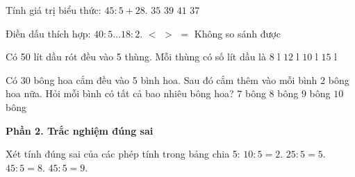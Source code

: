 \begin{ex} %
Tính giá trị biểu thức: $45 : 5 + 28$.
\choice
{$35$}
{$39$}
{$41$}
{\True $37$}
\end{ex}

\begin{ex} %
Điền dấu thích hợp: $40 : 5 \dots 18 : 2$.
\choice
{\True $<$}
{$>$}
{$=$}
{Không so sánh được}
\end{ex}

\begin{ex} %
Có 50 lít dầu rót đều vào 5 thùng. Mỗi thùng có số lít dầu là
\choice
{$8\text{ l}$}
{$12\text{ l}$}
{\True $10\text{ l}$}
{$15\text{ l}$}
\end{ex}

\begin{ex} %
Có 30 bông hoa cắm đều vào 5 bình hoa. Sau đó cắm thêm vào mỗi bình 2 bông hoa nữa. Hỏi mỗi bình có tất cả bao nhiêu bông hoa?
\choice
{$7$ bông}
{\True $8$ bông}
{$9$ bông}
{$10$ bông}
\end{ex}

\textbf{Phần 2. Trắc nghiệm đúng sai}

\begin{ex} %
Xét tính đúng sai của các phép tính trong bảng chia 5:
\choiceTF
{\True $10 : 5 = 2$.}
{\True $25 : 5 = 5$.}
{$45 : 5 = 8$.}
{\True $45 : 5 = 9$.}
\end{ex}

